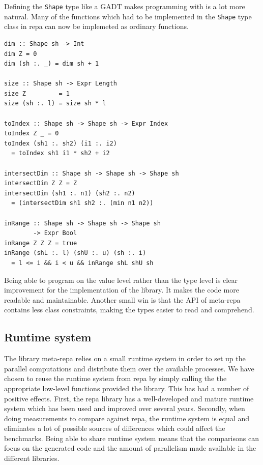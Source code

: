 \documentclass[preprint]{sigplanconf}
\begin{document}
Defining the \texttt{Shape} type like a GADT makes programming with is a
lot more natural. Many of the functions which had to be implemented in
the \texttt{Shape} type class in repa can now be implemeted as ordinary
functions.

\begin{verbatim}
dim :: Shape sh -> Int
dim Z = 0
dim (sh :. _) = dim sh + 1

size :: Shape sh -> Expr Length
size Z         = 1
size (sh :. l) = size sh * l

toIndex :: Shape sh -> Shape sh -> Expr Index
toIndex Z _ = 0
toIndex (sh1 :. sh2) (i1 :. i2)
  = toIndex sh1 i1 * sh2 + i2

intersectDim :: Shape sh -> Shape sh -> Shape sh
intersectDim Z Z = Z
intersectDim (sh1 :. n1) (sh2 :. n2)
  = (intersectDim sh1 sh2 :. (min n1 n2))

inRange :: Shape sh -> Shape sh -> Shape sh
        -> Expr Bool
inRange Z Z Z = true
inRange (shL :. l) (shU :. u) (sh :. i)
  = l <= i && i < u && inRange shL shU sh
\end{verbatim}

Being able to program on the value level rather than the type level is
clear improvement for the implementation of the library. It makes the
code more readable and maintainable. Another small win is that the API
of meta-repa contains less class constraints, making the types easier to
read and comprehend.

\subsection{Runtime system}

\label{sec:runtime}

The library meta-repa relies on a small runtime system in order to set
up the parallel computations and distribute them over the available
processes. We have chosen to reuse the runtime system from repa by
simply calling the the appropriate low-level functions provided the
library. This has had a number of positive effects. First, the repa
library has a well-developed and mature runtime system which has been
used and improved over several years. Secondly, when doing measurements
to compare against repa, the runtime system is equal and eliminates a
lot of possible sources of differences which could affect the
benchmarks. Being able to share runtime system means that the
comparisons can focus on the generated code and the amount of
parallelism made available in the different libraries.
\end{document}
